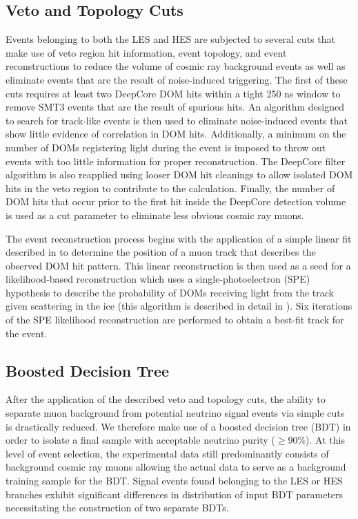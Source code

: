 \documentclass[manuscript]{aastex}
\begin{document}
\subsection{Veto and Topology Cuts}
Events belonging to both the LES and HES are subjected to several cuts that make use of veto region hit information, event topology, and event reconstructions to reduce the volume of cosmic ray background events as well as eliminate events that are the result of noise-induced triggering. The first of these cuts requires at least two DeepCore DOM hits within a tight 250 ns window to remove SMT3 events that are the result of spurious hits. An algorithm designed to search for track-like events is then used to eliminate noise-induced events that show little evidence of correlation in DOM hits. Additionally, a minimum on the number of DOMs registering light during the event is imposed to throw out events with too little information for proper reconstruction. The DeepCore filter algorithm is also reapplied using looser DOM hit cleanings to allow isolated DOM hits in the veto region to contribute to the calculation. Finally, the number of DOM hits that occur prior to the first hit inside the DeepCore detection volume is used as a cut parameter to eliminate less obvious cosmic ray muons.

The event reconstruction process begins with the application of a simple linear fit described in \cite{2014NIMPA.736..143A} to determine the position of a muon track that describes the observed DOM hit pattern. This linear reconstruction is then used as a seed for a likelihood-based reconstruction which uses a single-photoelectron (SPE) hypothesis to describe the probability of DOMs receiving light from the track given scattering in the ice (this algorithm is described in detail in \cite{2004NIMPA.524..169A}). Six iterations of the SPE likelihood reconstruction are performed to obtain a best-fit track for the event.
 
\subsection{Boosted Decision Tree}
After the application of the described veto and topology cuts, the ability to separate muon background from potential neutrino signal events via simple cuts is drastically reduced. We therefore make use of a boosted decision tree (BDT) in order to isolate a final sample with acceptable neutrino purity ($\geq 90\%$). At this level of event selection, the experimental data still predominantly consists of background cosmic ray muons allowing the actual data to serve as a background training sample for the BDT. Signal events found belonging to the LES or HES branches exhibit significant differences in distribution of input BDT parameters necessitating the construction of two separate BDTs. 
\end{document}
